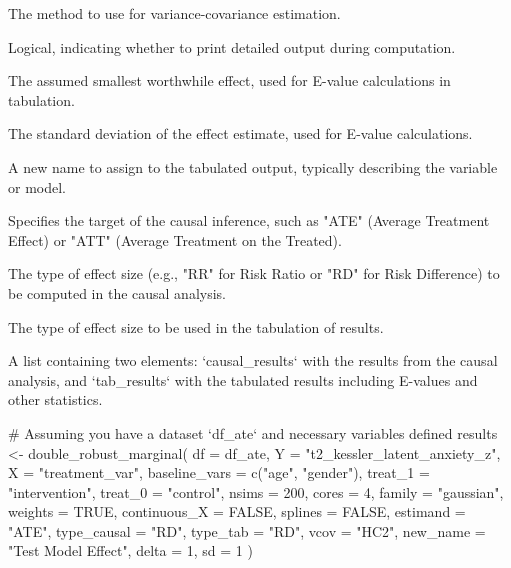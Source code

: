 \documentclass[a4paper]{book}
\begin{document}
\begin{Arguments}
\begin{ldescription}
\item[\code{vcov}] The method to use for variance-covariance estimation.

\item[\code{verbose}] Logical, indicating whether to print detailed output during computation.

\item[\code{delta}] The assumed smallest worthwhile effect, used for E-value calculations in tabulation.

\item[\code{sd}] The standard deviation of the effect estimate, used for E-value calculations.

\item[\code{new\_name}] A new name to assign to the tabulated output, typically describing the variable or model.

\item[\code{estimand}] Specifies the target of the causal inference, such as "ATE" (Average Treatment Effect) or "ATT" (Average Treatment on the Treated).

\item[\code{type\_causal}] The type of effect size (e.g., "RR" for Risk Ratio or "RD" for Risk Difference) to be computed in the causal analysis.

\item[\code{type\_tab}] The type of effect size to be used in the tabulation of results.
\end{ldescription}
\end{Arguments}
%
\begin{Value}
A list containing two elements: `causal\_results` with the results from the causal analysis, and
`tab\_results` with the tabulated results including E-values and other statistics.
\end{Value}
%
\begin{Examples}
\begin{ExampleCode}
# Assuming you have a dataset `df_ate` and necessary variables defined
results <- double_robust_marginal(
  df = df_ate,
  Y = "t2_kessler_latent_anxiety_z",
  X = "treatment_var",
  baseline_vars = c("age", "gender"),
  treat_1 = "intervention",
  treat_0 = "control",
  nsims = 200,
  cores = 4,
  family = "gaussian",
  weights = TRUE,
  continuous_X = FALSE,
  splines = FALSE,
  estimand = "ATE",
  type_causal = "RD",
  type_tab = "RD",
  vcov = "HC2",
  new_name = "Test Model Effect",
  delta = 1,
  sd = 1
)

\end{ExampleCode}
\end{Examples}
\end{document}
